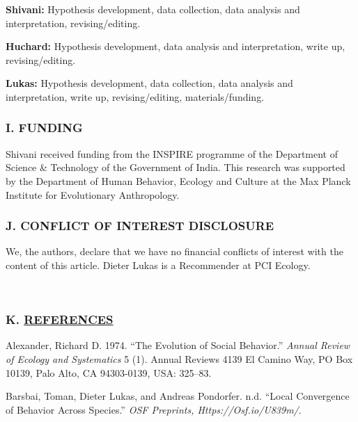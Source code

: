 \documentclass[]{article}
\begin{document}
\textbf{Shivani:} Hypothesis development, data collection, data analysis
and interpretation, revising/editing.

\textbf{Huchard:} Hypothesis development, data analysis and
interpretation, write up, revising/editing.

\textbf{Lukas:} Hypothesis development, data collection, data analysis
and interpretation, write up, revising/editing, materials/funding.

\hypertarget{i.-funding}{%
\subsubsection{I. FUNDING}\label{i.-funding}}

Shivani received funding from the INSPIRE programme of the Department of
Science \& Technology of the Government of India. This research was
supported by the Department of Human Behavior, Ecology and Culture at
the Max Planck Institute for Evolutionary Anthropology.

\hypertarget{j.-conflict-of-interest-disclosure}{%
\subsubsection{J. CONFLICT OF INTEREST
DISCLOSURE}\label{j.-conflict-of-interest-disclosure}}

We, the authors, declare that we have no financial conflicts of interest
with the content of this article. Dieter Lukas is a Recommender at PCI
Ecology.

~

\hypertarget{k.-references}{%
\subsubsection*{\texorpdfstring{K.
\href{MyLibrary.bib}{REFERENCES}}{K. REFERENCES}}\label{k.-references}}

\hypertarget{refs}{}
\leavevmode\hypertarget{ref-alexander1974evolution}{}%
Alexander, Richard D. 1974. ``The Evolution of Social Behavior.''
\emph{Annual Review of Ecology and Systematics} 5 (1). Annual Reviews
4139 El Camino Way, PO Box 10139, Palo Alto, CA 94303-0139, USA:
325--83.

\leavevmode\hypertarget{ref-barsbai2020similarity}{}%
Barsbai, Toman, Dieter Lukas, and Andreas Pondorfer. n.d. ``Local
Convergence of Behavior Across Species.'' \emph{OSF Preprints,
Https://Osf.io/U839m/}.
\end{document}
